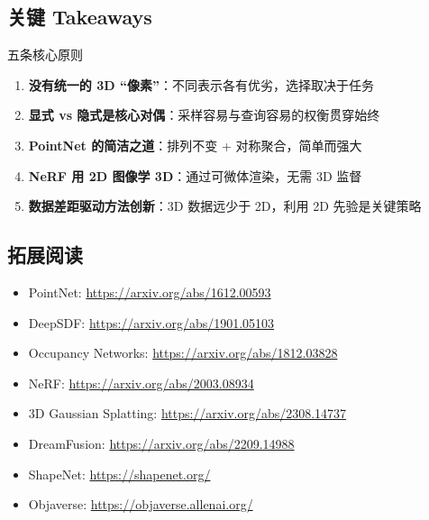 \subsection{关键 Takeaways}

\begin{importantbox}{五条核心原则}
\begin{enumerate}
    \item \textbf{没有统一的 3D ``像素''}：不同表示各有优劣，选择取决于任务
    \item \textbf{显式 vs 隐式是核心对偶}：采样容易与查询容易的权衡贯穿始终
    \item \textbf{PointNet 的简洁之道}：排列不变 + 对称聚合，简单而强大
    \item \textbf{NeRF 用 2D 图像学 3D}：通过可微体渲染，无需 3D 监督
    \item \textbf{数据差距驱动方法创新}：3D 数据远少于 2D，利用 2D 先验是关键策略
\end{enumerate}
\end{importantbox}

\subsection{拓展阅读}

\begin{itemize}
    \item PointNet: \url{https://arxiv.org/abs/1612.00593}
    \item DeepSDF: \url{https://arxiv.org/abs/1901.05103}
    \item Occupancy Networks: \url{https://arxiv.org/abs/1812.03828}
    \item NeRF: \url{https://arxiv.org/abs/2003.08934}
    \item 3D Gaussian Splatting: \url{https://arxiv.org/abs/2308.14737}
    \item DreamFusion: \url{https://arxiv.org/abs/2209.14988}
    \item ShapeNet: \url{https://shapenet.org/}
    \item Objaverse: \url{https://objaverse.allenai.org/}
\end{itemize}


